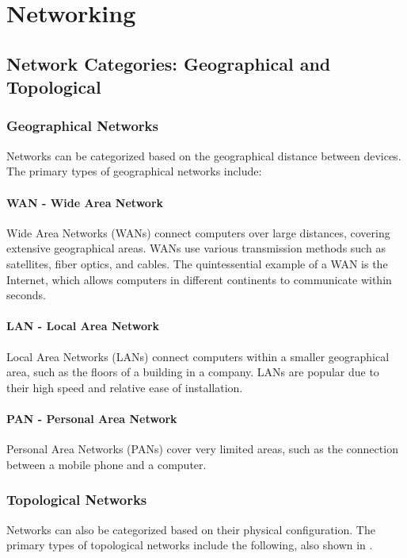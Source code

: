 \section{Networking}
\subsection{Network Categories: Geographical and Topological}
\subsubsection{Geographical Networks}

Networks can be categorized based on the geographical distance between devices. The primary types of geographical networks include:

\paragraph{WAN - Wide Area Network}
Wide Area Networks (WANs) connect computers over large distances, covering extensive geographical areas. WANs use various transmission methods such as satellites, fiber optics, and cables. The quintessential example of a WAN is the Internet, which allows computers in different continents to communicate within seconds.

\paragraph{LAN - Local Area Network}
Local Area Networks (LANs) connect computers within a smaller geographical area, such as the floors of a building in a company. LANs are popular due to their high speed and relative ease of installation.

\paragraph{PAN - Personal Area Network}
Personal Area Networks (PANs) cover very limited areas, such as the connection between a mobile phone and a computer.

\subsubsection{Topological Networks}

Networks can also be categorized based on their physical configuration. The primary types of topological networks include the following, also shown in .

